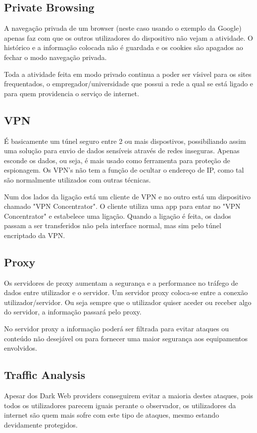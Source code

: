 \documentclass{llncs}
\begin{document}
\subsection{Private Browsing}
A navegação privada de um browser (neste caso usando o exemplo da Google) apenas faz com que os outros utilizadores do dispositivo não vejam a atividade.
O histórico e a informação colocada não é guardada e os cookies são apagados ao fechar o modo navegação privada.

Toda a atividade feita em modo privado continua a poder ser vísivel para os sites frequentados, o empregador/universidade que possui a rede a qual se está ligado e para quem providencia o serviço de internet. \cite{pbw}

\subsection{VPN}
É basicamente um túnel seguro entre 2 ou mais dispostivos, possibiliando assim uma solução para envio de dados sensíveis através de redes inseguras.
Apenas esconde os dados, ou seja, é mais usado como ferramenta para proteção de espionagem. \cite{vpn}
Os VPN's não tem a função de ocultar o endereço de IP, como tal são normalmente utilizados com outras técnicas. \cite{vpnslide}

Num dos lados da ligação está um cliente de VPN e no outro está um dispositivo chamado "VPN Concentrator". O cliente utiliza uma app para entar no "VPN Concentrator" e estabelece uma ligação.
Quando a ligação é feita, os dados passam a ser transferidos não pela interface normal, mas sim pelo túnel encriptado da VPN. \cite{thai}

\subsection{Proxy}
Os servidores de proxy aumentam a segurança e a performance no tráfego de dados entre utilizador e o servidor.
Um servidor proxy coloca-se entre a conexão utilizador/servidor. Ou seja sempre que o utilizador quiser aceder ou receber algo do servidor, a informação passará pelo proxy. \cite{proxy}

No servidor proxy a informação poderá ser filtrada para evitar ataques ou conteúdo não desejável ou para fornecer uma maior segurança aos equipamentos envolvidos. \cite{thai}

\subsection{Traffic Analysis} 
Apesar dos Dark Web providers conseguirem evitar a maioria destes ataques, pois todos os utilizadores parecem iguais perante o observador, os utilizadores da internet são quem mais sofre com este tipo de ataques, mesmo estando devidamente protegidos.
\end{document}

